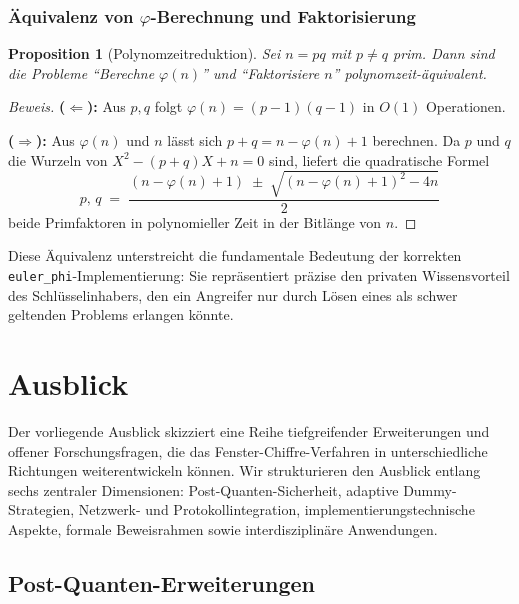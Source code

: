 ﻿\documentclass[12pt, a4paper]{article}
\theoremstyle{plain}
\newtheorem{proposition}[theorem]{Proposition}
\theoremstyle{definition}
\theoremstyle{remark}
\newenvironment{myproof}[1][Beweis]{%
  \begin{proof}[#1]
}{%
  \end{proof}
}
\begin{document}
\subsubsection{\"Aquivalenz von $\varphi$-Berechnung und Faktorisierung}

\begin{proposition}[Polynomzeitreduktion]\label{prop:phi_faktor_equiv}
  Sei $n = pq$ mit $p \ne q$ prim. Dann sind die Probleme
  ``Berechne $\varphi(n)$'' und ``Faktorisiere $n$''
  polynomzeit-\"aquivalent.
\end{proposition}

\begin{myproof}
  \textbf{($\Leftarrow$):} Aus $p, q$ folgt $\varphi(n) = (p-1)(q-1)$
  in $O(1)$ Operationen.

  \textbf{($\Rightarrow$):} Aus $\varphi(n)$ und $n$ l\"asst sich
  $p + q = n - \varphi(n) + 1$ berechnen. Da $p$ und $q$ die Wurzeln
  von $X^2 - (p+q)X + n = 0$ sind, liefert die quadratische Formel
  \[
    p,\, q \;=\; \frac{(n - \varphi(n) + 1) \;\pm\;
               \sqrt{(n - \varphi(n) + 1)^2 - 4n}}{2}
  \]
  beide Primfaktoren in polynomieller Zeit in der Bitl\"ange von $n$.
\end{myproof}

Diese \"Aquivalenz unterstreicht die fundamentale Bedeutung der
korrekten \texttt{euler\_phi}-Implementierung: Sie repr\"asentiert
pr\"azise den privaten Wissensvorteil des Schl\"usselinhabers, den
ein Angreifer nur durch L\"osen eines als schwer geltenden Problems
erlangen k\"onnte.

\section{Ausblick}
\label{sec:ausblick}

Der vorliegende Ausblick skizziert eine Reihe tiefgreifender Erweiterungen
und offener Forschungsfragen, die das Fenster-Chiffre-Verfahren in
unterschiedliche Richtungen weiterentwickeln k\"onnen. Wir strukturieren
den Ausblick entlang sechs zentraler Dimensionen: Post-Quanten-Sicherheit,
adaptive Dummy-Strategien, Netzwerk- und Protokollintegration,
implementierungstechnische Aspekte, formale Beweisrahmen sowie
interdisziplin\"are Anwendungen.

\subsection{Post-Quanten-Erweiterungen}
\end{document}
